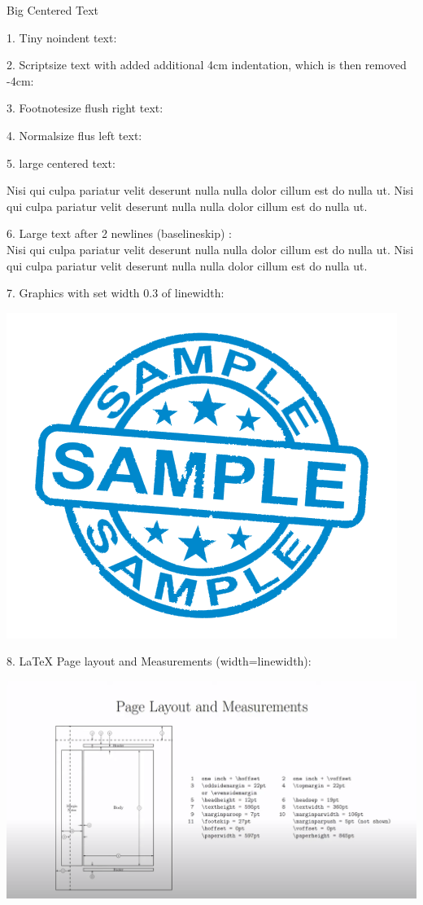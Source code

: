 \documentclass[12pt]{article}
\begin{document}
\begin{center}
    {\Huge Big Centered Text}
\end{center}

1. Tiny noindent text: \\
{\tiny\noindent\Blindtext[1][1]}

2. Scriptsize text with added additional 4cm indentation, which is then removed -4cm:

\addtolength{\parindent}{4cm}
{\scriptsize\Blindtext[1][1]}
\addtolength{\parindent}{-4cm}

3. Footnotesize flush right text:
\begin{flushright}
{\footnotesize\Blindtext[1][1]}
\end{flushright}

4. Normalsize flus left text:
\begin{flushleft}
{\normalsize\Blindtext[1][1]}
\end{flushleft}

5. large centered text:
\begin{center}
{\large Nisi qui culpa pariatur velit deserunt nulla nulla dolor cillum est do nulla ut. Nisi qui culpa pariatur velit deserunt nulla nulla dolor cillum est do nulla ut.}
\end{center}

6. Large text after 2 newlines (baselineskip) : \\[2\baselineskip]
{\Large Nisi qui culpa pariatur velit deserunt nulla nulla dolor cillum est do nulla ut. Nisi qui culpa pariatur velit deserunt nulla nulla dolor cillum est do nulla ut.}

7. Graphics with set width 0.3 of linewidth:
\begin{center}
    \includegraphics[width=0.3\linewidth]{sample.png}
\end{center}

\newpage

8. LaTeX Page layout and Measurements (width=linewidth):
\begin{center}
    \includegraphics[width=\linewidth]{page_layout.png}
\end{center}
\end{document}
